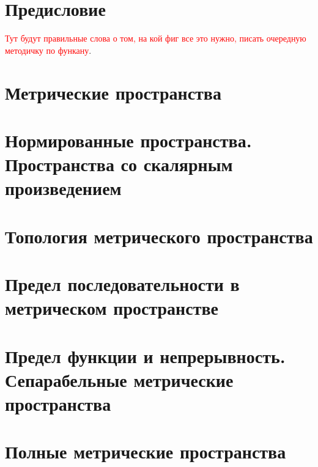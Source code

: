 \documentclass[12pt]{article}						%
\begin{document}
{\setcounter{page}{3}

\tableofcontents
\newpage

\section*{Предисловие}

	\textcolor{red}{Тут будут правильные слова о том, на кой фиг все это нужно, писать очередную методичку по функану}.
	\newpage

\section{Метрические пространства}

	
	
	
	\newpage

\section{Нормированные пространства. Пространства со скалярным произведением}

	
	
	
	\newpage

\section{Топология метрического пространства}

	
	
	
	\newpage

\section{Предел последовательности в метрическом пространстве}

	
	
	
	\newpage

\section{Предел функции и непрерывность. Сепарабельные метрические пространства}

	
	
	
	\newpage

\section{Полные метрические пространства}

}
\end{document}
